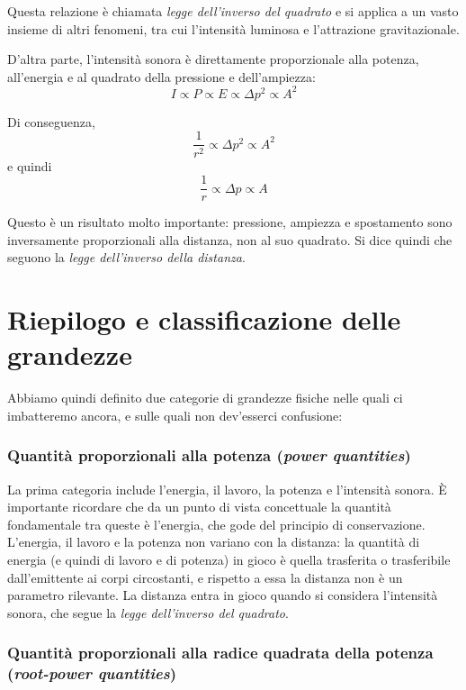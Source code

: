 Questa relazione è chiamata \emph{legge dell'inverso del quadrato} e si applica a un vasto insieme di altri fenomeni, tra cui l'intensità luminosa e l'attrazione gravitazionale.

D'altra parte, l'intensità sonora è direttamente proporzionale alla potenza, all'energia e al quadrato della pressione e dell'ampiezza:
\begin{equation}
I \propto P \propto E \propto \Delta p^2 \propto A^2
\end{equation}

Di conseguenza,
\begin{equation}
\frac{1}{r^2} \propto \Delta p^2 \propto A^2
\end{equation}
e quindi
\begin{equation}
\frac{1}{r} \propto \Delta p \propto A
\end{equation}

Questo è un risultato molto importante: pressione, ampiezza e spostamento sono inversamente proporzionali alla distanza, non al suo quadrato. Si dice quindi che seguono la \emph{legge dell'inverso della distanza}.



\section{Riepilogo e classificazione delle grandezze}

Abbiamo quindi definito due categorie di grandezze fisiche nelle quali ci imbatteremo ancora, e sulle quali non dev'esserci confusione:

\subsubsection{Quantità proporzionali alla potenza (\emph{power quantities})}

La prima categoria include l'energia, il lavoro, la potenza e l'intensità sonora. È importante ricordare che da un punto di vista concettuale la quantità fondamentale tra queste è l'energia, che gode del principio di conservazione. L'energia, il lavoro e la potenza non variano con la distanza: la quantità di energia (e quindi di lavoro e di potenza) in gioco è quella trasferita o trasferibile dall'emittente ai corpi circostanti, e rispetto a essa la distanza non è un parametro rilevante. La distanza entra in gioco quando si considera l'intensità sonora, che segue la \emph{legge dell'inverso del quadrato}.


\subsubsection{Quantità proporzionali alla radice quadrata della potenza (\emph{root-power quantities})}

